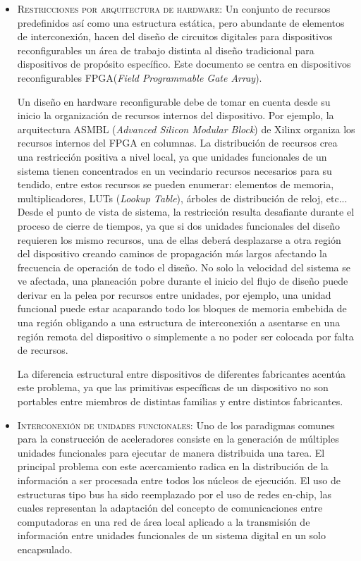 	\begin{itemize}

			\item 	\textsc{Restricciones por arquitectura de hardware}: Un conjunto de recursos predefinidos así como una estructura estática, pero abundante de elementos de interconexión, hacen del diseño de circuitos digitales para dispositivos reconfigurables un área de trabajo distinta al diseño tradicional para dispositivos de propósito específico. Este documento se centra en dispositivos reconfigurables FPGA(\textit{Field Programmable Gate Array}).

			Un diseño en hardware reconfigurable debe de tomar en cuenta desde su inicio la organización de recursos internos del dispositivo. Por ejemplo, la arquitectura ASMBL\cite{chapter0:Xilinx:UG474} (\textit{Advanced Silicon Modular Block}) de Xilinx organiza los recursos internos del FPGA en columnas. La distribución de recursos crea una restricción positiva a nivel local, ya que unidades funcionales de un sistema tienen concentrados en un vecindario recursos necesarios para su tendido, entre estos recursos se pueden enumerar: elementos de memoria, multiplicadores, LUTs (\textit{Lookup Table}), árboles de distribución de reloj, etc... Desde el punto de vista de sistema, la restricción resulta desafiante durante el proceso de cierre de tiempos, ya que si dos unidades funcionales del diseño requieren los mismo recursos, una de ellas deberá desplazarse a otra región del dispositivo creando caminos de propagación más largos afectando la frecuencia de operación de todo el diseño. No solo la velocidad del sistema se ve afectada, una planeación pobre durante el inicio del flujo de diseño puede derivar en la pelea por recursos entre unidades, por ejemplo, una unidad funcional puede estar acaparando todo los bloques de memoria embebida de una región obligando a una estructura de interconexión a asentarse en una región remota del dispositivo o simplemente a no poder ser colocada por falta de recursos.

			La diferencia estructural entre dispositivos de diferentes fabricantes acentúa este problema, ya que las primitivas específicas de un dispositivo no son portables entre miembros de distintas familias y entre distintos fabricantes.


			\item 	\textsc{Interconexión de unidades funcionales:} Uno de los paradigmas comunes para la construcción de aceleradores consiste en la generación de múltiples unidades funcionales para ejecutar de manera distribuida una tarea. El principal problema con este acercamiento radica en la distribución de la información a ser procesada entre todos los núcleos de ejecución. El uso de estructuras tipo bus ha sido reemplazado por el uso de redes en-chip\cite{chapter0:976921, chapter0:1511986, chapter0:1347918}, las cuales representan la adaptación del concepto de comunicaciones entre computadoras en una red de área local aplicado a la transmisión de información entre unidades funcionales de un sistema digital en un solo encapsulado.


\end{itemize}
